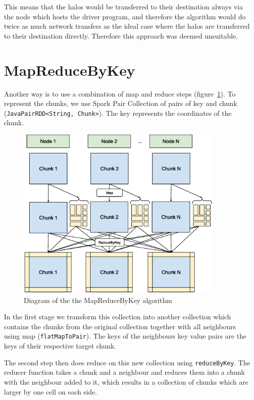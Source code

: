 \documentclass{l4proj}
\begin{document}
This means that the halos would be transferred to their destination always via
the node which hosts the driver program, and therefore the algorithm would do 
twice as much network transfers as the ideal case where the halos are transferred
to their destination directly. Therefore this approach was deemed unsuitable. 

\section{MapReduceByKey}

Another way is to use a combination of map and reduce steps (figure~\ref{fig:map_reduce}). To represent the 
chunks, we use Spark Pair Collection of pairs of key and chunk (\texttt{JavaPairRDD<String, Chunk>}). The key represents
the coordinates of the chunk.

\begin{figure}
\centering
\includegraphics[width=0.9\textwidth]{images/MapReduce.eps}
\caption{Diagram of the the MapReduceByKey algorithm}
\label{fig:map_reduce}
\end{figure}

In the first stage we transform this collection into another collection which contains
the chunks from the original collection together with all neighbours using map
(\texttt{flatMapToPair}). The keys of the neighbours key value pairs are the keys of their respective
target chunk.

The second step then does reduce on this new collection using \texttt{reduceByKey}. 
The reducer function takes a chunk and a neighbour and reduces them into a chunk
with the neighbour added to it, which results in a collection of chunks which are
larger by one cell on each side.
\end{document}
